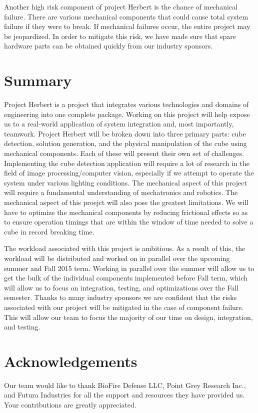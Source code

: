 \documentclass[final, letterpaper, 10 pt, conference, onecolumn]{IEEEtran}
\begin{document}
Another high risk component of project Herbert is the chance of mechanical failure. There are various mechanical components that could cause total system failure if they were to break. If mechanical failures occur, the entire project may be jeopardized. In order to mitigate this risk, we have made sure that spare hardware parts can be obtained quickly from our industry sponsors.

\section{Summary}
Project Herbert is a project that integrates various technologies and domains of engineering into one complete package. Working on this project will help expose us to a real-world application of system integration and, most importantly, teamwork. Project Herbert will be broken down into three primary parts: cube detection, solution generation, and the physical manipulation of the cube using mechanical components. Each of these
will present their own set of challenges. Implementing the cube detection application will require a lot of research in the field of image processing/computer vision, especially if we attempt to operate the system under various lighting conditions. The mechanical
aspect of this project will require a fundamental understanding of mechatronics and robotics. The mechanical aspect of this proejct will also pose the greatest limitations. We will have to optimize the mechanical components by reducing frictional effects so as to ensure operation timings that are
within the window of time needed to solve a cube in record breaking time.

The workload associated with this project is ambitious. As a result of this, the workload will be distributed and worked on in parallel over the upcoming summer
and Fall 2015 term. Working in parallel over the summer will allow us to get the bulk of the individual components implemented before Fall term, which will allow us to focus on integration, testing, and
optimizations over the Fall semester. Thanks to many industry sponsors we are confident that the risks associated with our project will be mitigated in the case of component failure. This will allow
our team to focus the majority of our time on design, integration, and testing.

\section{Acknowledgements}
Our team would like to thank BioFire Defense LLC, Point Grey Research Inc., and Futura Industries for all the support and resources they have provided us. Your contributions are greatly appreciated.
\end{document}
